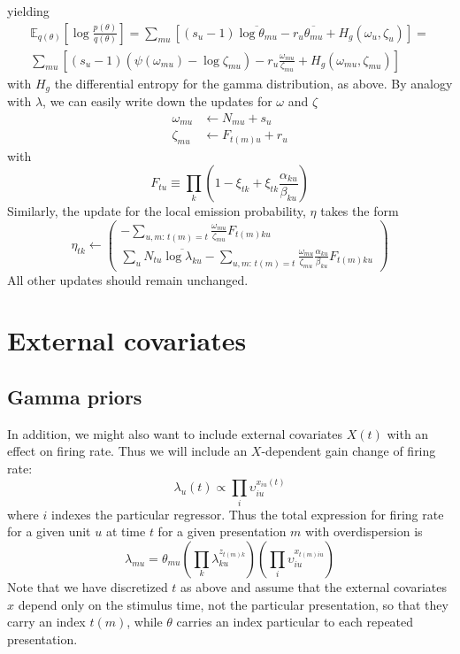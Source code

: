 \documentclass[11pt]{article}
\begin{document}
yielding
\begin{multline}
    \mathbb{E}_{q(\theta)} \left[ \log \frac{p(\theta)}{q(\theta)} \right] =
    \sum_{mu} \left[ (s_u - 1) \overline{\log \theta_{mu}} - r_u \overline{\theta_{mu}} + H_g(\omega_u, \zeta_u) \right] =\\
    \sum_{mu} \left[ (s_u - 1) (\psi(\omega_{mu}) - \log \zeta_{mu}) - r_u \frac{\omega_{mu}}{\zeta_{mu}} + H_g(\omega_{mu}, \zeta_{mu}) \right]
\end{multline}
with $H_g$ the differential entropy for the gamma distribution, as above. By analogy with $\lambda$, we can easily write down the updates for $\omega$ and $\zeta$
\begin{align}
    \omega_{mu} &\leftarrow N_{mu} + s_u \\
    \zeta_{mu} &\leftarrow F_{t(m)u} + r_u 
\end{align}
with 
\begin{equation}
    F_{tu} \equiv \prod_k \left( 1 - \xi_{tk} + \xi_{tk} \frac{\alpha_{ku}}{\beta_{ku}}\right)
\end{equation}
Similarly, the update for the local emission probability, $\eta$ takes the form
\begin{equation}
    \eta_{tk} \leftarrow 
    \begin{pmatrix}
        -\sum_{u, m: \, t(m) = t} \frac{\omega_{mu}}{\zeta_{mu}} F_{t(m)ku} \\
        \sum_u N_{tu} \overline{\log \lambda_{ku}} -
        \sum_{u, m: \, t(m) = t} \frac{\omega_{mu}} {\zeta_{mu}}\frac{\alpha_{ku}}{\beta_{ku}} F_{t(m)ku} 
    \end{pmatrix} 
\end{equation}
All other updates should remain unchanged.

\section{External covariates}
\subsection{Gamma priors}
In addition, we might also want to include external covariates $X(t)$ with an effect on firing rate. Thus we will include an $X$-dependent gain change of firing rate:
\begin{equation}
    \lambda_{u}(t) \propto \prod_i \upsilon_{iu}^{x_{iu}(t)}
\end{equation}
where $i$ indexes the particular regressor. Thus the total expression for firing rate for a given unit $u$ at time $t$ for a given presentation $m$ with overdispersion is
\begin{equation}
    \lambda_{mu} = \theta_{mu}\left(\prod_k \lambda_{ku}^{z_{t(m)k}} \right) \left(\prod_i \upsilon_{iu}^{x_{t(m)iu}} \right)
\end{equation}
Note that we have discretized $t$ as above and assume that the external covariates $x$ depend only on the stimulus time, not the particular presentation, so that they carry an index $t(m)$, while $\theta$ carries an index particular to each repeated presentation.
\end{document}
